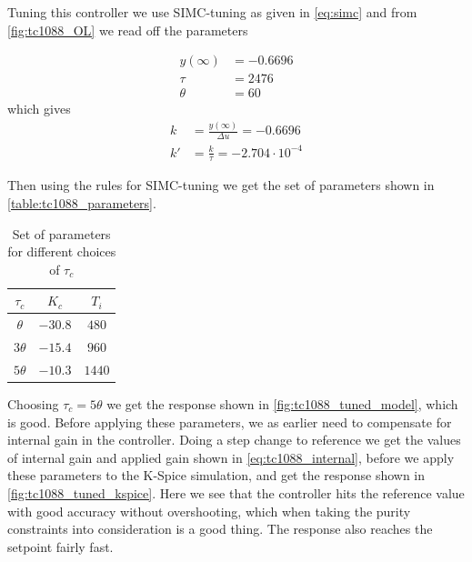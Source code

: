 Tuning this controller we use SIMC-tuning as given in \autoref{eq:simc} and from \autoref{fig:tc1088_OL} we read off the parameters 

\begin{equation}
	\begin{aligned}
		y(\infty) &= -0.6696 \\
		\tau &= 2476 \\
		\theta &= 60
	\end{aligned}
\end{equation}
which gives
\begin{equation}
	\begin{aligned}
		k &= \frac{y(\infty)}{\Delta u } = -0.6696\\
		k' &= \frac{k}{\tau} = -2.704 \cdot 10^{-4}
	\end{aligned}
\end{equation}

Then using the rules for SIMC-tuning we get the set of parameters shown in \autoref{table:tc1088_parameters}.

\begin{table}[h]
	\caption{Set of parameters for different choices of $\tau_c$}
	\label{table:tc1088_parameters}
	\begin{center}
	\begin{tabular}{|c|c|c|}
	\hline
	$\tau_c$ & $K_c$ & $T_i$ \\
	\hline
	$\theta$ & $-30.8$ & $480$\\
	$3\theta$ & $-15.4$ & $960$\\
	$5\theta$ & $-10.3$ & $1440$\\
	\hline
	\end{tabular}
	\end{center}
\end{table}

Choosing $\tau_c = 5\theta$ we get the response shown in \autoref{fig:tc1088_tuned_model}, which is good. Before applying these parameters, we as earlier need to compensate for internal gain in the controller. Doing a step change to reference we get the values of internal gain and applied gain shown in \autoref{eq:tc1088_internal}, before we apply these parameters to the K-Spice simulation, and get the response shown in \autoref{fig:tc1088_tuned_kspice}. Here we see that the controller hits the reference value with good accuracy without overshooting, which when taking the purity constraints into consideration is a good thing. The response also reaches the setpoint fairly fast.

